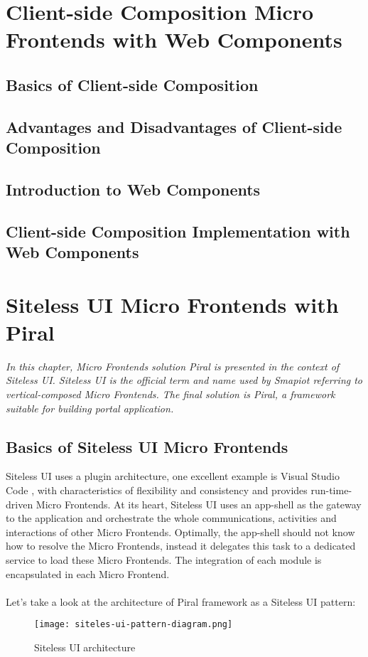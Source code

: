 \documentclass[a4paper]{book}
\begin{document}

\chapter{Client-side Composition Micro Frontends with Web Components}
\section{Basics of Client-side Composition}
\section{Advantages and Disadvantages of Client-side Composition}
\section{Introduction to Web Components}
\section{Client-side Composition Implementation with Web Components}

\chapter{Siteless UI Micro Frontends with Piral}
\textit{In this chapter, Micro Frontends solution Piral is presented in the context of Siteless UI. Siteless UI is the official term and name used by Smapiot referring to vertical-composed Micro Frontends. The final solution is Piral, a framework suitable for building portal application.} \cite{Piral}
\section{Basics of Siteless UI Micro Frontends}
Siteless UI uses a plugin architecture, one excellent example is Visual Studio Code \cite{VSCode}, with characteristics of flexibility and consistency and provides run-time-driven Micro Frontends. At its heart, Siteless UI uses an app-shell as the gateway to the application and orchestrate the whole communications, activities and interactions of other Micro Frontends. Optimally, the app-shell should not know how to resolve the Micro Frontends, instead it delegates this task to a dedicated service to load these Micro Frontends. The integration of each module is encapsulated in each Micro Frontend. 
\\ \\ 
Let’s take a look at the architecture of Piral framework as a Siteless UI pattern:
\begin{figure}[h!]
    \centering
    \captionsetup{justification=centering}
    \texttt{[image: siteles-ui-pattern-diagram.png]}
    \caption{Siteless UI architecture \cite{Rap20}}
    \label{fig:siteles-ui-pattern-diagram}
\end{figure}
\end{document}
